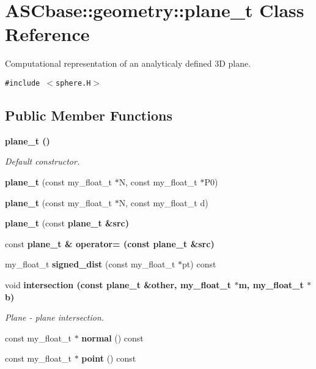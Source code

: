 \section{ASCbase::geometry::plane\_\-t Class Reference}
\label{classASCbase_1_1geometry_1_1plane__t}
Computational representation of an analyticaly defined 3D plane.  


{\tt \#include $<$sphere.H$>$}

\subsection*{Public Member Functions}
\begin{CompactItemize}
\item 
\bf{plane\_\-t} ()\label{classASCbase_1_1geometry_1_1plane__t_6a96b14a51383e4f04b440fa4f89ce72}

\begin{CompactList}\small\item\em Default constructor. \item\end{CompactList}\item 
\textbf{plane\_\-t} (const my\_\-float\_\-t $\ast$N, const my\_\-float\_\-t $\ast$P0)\label{classASCbase_1_1geometry_1_1plane__t_e9e131b4396c0cfd95ca45fe5e10c7fc}

\item 
\textbf{plane\_\-t} (const my\_\-float\_\-t $\ast$N, const my\_\-float\_\-t d)\label{classASCbase_1_1geometry_1_1plane__t_59a4c03593f8738e75c8058bca6ae3b5}

\item 
\textbf{plane\_\-t} (const \bf{plane\_\-t} \&src)\label{classASCbase_1_1geometry_1_1plane__t_3bcc78fa427df47158b7a929f5daf4f5}

\item 
const \bf{plane\_\-t} \& \textbf{operator=} (const \bf{plane\_\-t} \&src)\label{classASCbase_1_1geometry_1_1plane__t_52998da3f919f0dc7ad81b41ff06a6fa}

\item 
my\_\-float\_\-t \textbf{signed\_\-dist} (const my\_\-float\_\-t $\ast$pt) const \label{classASCbase_1_1geometry_1_1plane__t_d07a8d10378c09fa6e685ac904c2646d}

\item 
void \bf{intersection} (const \bf{plane\_\-t} \&other, my\_\-float\_\-t $\ast$m, my\_\-float\_\-t $\ast$b)
\begin{CompactList}\small\item\em Plane - plane intersection. \item\end{CompactList}\item 
const my\_\-float\_\-t $\ast$ \textbf{normal} () const \label{classASCbase_1_1geometry_1_1plane__t_46707f1b4f2a00ea36fc49e783d153b9}

\item 
const my\_\-float\_\-t $\ast$ \textbf{point} () const \label{classASCbase_1_1geometry_1_1plane__t_85dd05c8e741d2bb84bdf62e00831108}

\end{CompactItemize}
